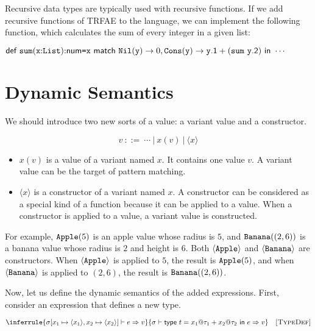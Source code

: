 Recursive data types are typically used with recursive functions. If we add
recursive functions of \textsf{TRFAE} to the language, we can implement the
following  function, which calculates the sum of every integer in a
given list:

$\erect{\code{sum}}{\cx}{\code{List}}{\tnum}{
  \ematch{\cx}{\code{Nil}}{\cy}{0}{\code{Cons}}{\cy}{
    \cy\textsf{.1}+(\code{sum}\ \cy\textsf{.2})
  }
}{\cdots}$

\section{Dynamic Semantics}

We should introduce two new sorts of a value: a variant value and a constructor.

\[ v \ ::= \ \cdots\ |\ x(v)\ |\ \langle x\rangle \]

\begin{itemize}
  \item $x(v)$ is a value of a variant named $x$. It contains one value $v$.
    A variant value can be the target of pattern matching.
  \item $\langle x\rangle$ is a constructor of a variant named $x$. A
    constructor can be considered as a special kind of a function because it can
    be applied to a value. When a constructor is applied to a value, a variant
    value is constructed.
\end{itemize}

For example, $\texttt{Apple}(5)$ is an apple value whose radius is $5$, and
$\texttt{Banana}((2,6))$ is a banana value whose radius is $2$ and height is $6$.
Both $\langle\texttt{Apple}\rangle$ and $\langle\texttt{Banana}\rangle$ are
constructors. When $\langle\texttt{Apple}\rangle$ is applied to $5$, the result is
$\texttt{Apple}(5)$, and when $\langle\texttt{Banana}\rangle$ is applied to $(2,6)$,
the result is $\texttt{Banana}((2,6))$.

Now, let us define the dynamic semantics of the added expressions. First,
consider an expression that defines a new type.


\vspace{-1em}

\[
  \inferrule
  { \eval{\sigma[x_1\mapsto \langle x_1\rangle,x_2\mapsto \langle x_2\rangle]}
    {e}{v} }
  { \evald{\etdef{t}{x_1}{\tau_1}{x_2}{\tau_2}{e}}{v} }
  \quad\textsc{[TypeDef]}
\]

